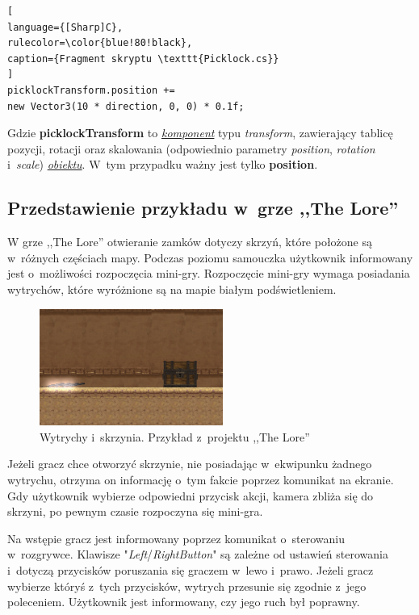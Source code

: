 \documentclass[oneside,polski,logo]{amuthesis}
\begin{document}
\begin{lstlisting}[
language={[Sharp]C},
rulecolor=\color{blue!80!black},
caption={Fragment skryptu \texttt{Picklock.cs}}
]
picklockTransform.position += 
new Vector3(10 * direction, 0, 0) * 0.1f;
\end{lstlisting}

Gdzie \textbf{picklockTransform} to \hyperref[sec:komponent]{\emph{komponent}} typu \emph{transform}, zawierający tablicę pozycji, rotacji oraz skalowania (odpowiednio parametry \emph{position}, \emph{rotation} i~\emph{scale}) \hyperref[sec:gameobject]{\emph{obiektu}}. W~tym przypadku ważny jest tylko \textbf{position}. 

\subsection{Przedstawienie przykładu w~grze ,,The Lore''}
W grze ,,The Lore'' otwieranie zamków dotyczy skrzyń, które położone są w~różnych częściach mapy. Podczas poziomu samouczka użytkownik informowany jest o~możliwości rozpoczęcia mini-gry. Rozpoczęcie mini-gry wymaga posiadania wytrychów, które wyróżnione są na mapie białym podświetleniem.


\begin{figure}[h]
	\centering
	\includegraphics[width=6cm]{images/tyrek/skrzynia.png}
	\caption{Wytrychy i~skrzynia. Przykład z~projektu ,,The Lore''}
\end{figure}

Jeżeli gracz chce otworzyć skrzynie, nie posiadając w~ekwipunku żadnego wytrychu, otrzyma on informację o~tym fakcie poprzez komunikat na ekranie. Gdy użytkownik wybierze odpowiedni przycisk akcji, kamera zbliża się do skrzyni, po pewnym czasie rozpoczyna się mini-gra.

Na wstępie gracz jest informowany poprzez komunikat o~sterowaniu w~rozgrywce. Klawisze "\emph{Left}/\emph{RightButton}" są zależne od ustawień sterowania i~dotyczą przycisków poruszania się graczem w~lewo i~prawo. Jeżeli gracz wybierze któryś z~tych przycisków, wytrych przesunie się zgodnie z~jego poleceniem. Użytkownik jest informowany, czy jego ruch był poprawny.
\end{document}
